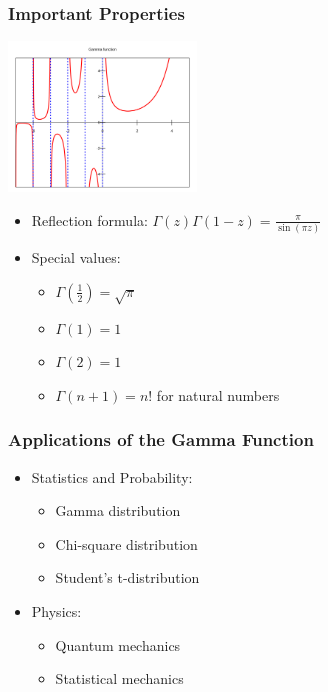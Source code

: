 \documentclass[12pt]{beamer}
\begin{document}
\begin{frame}
	\frametitle{Important Properties}
	\centering
	\includegraphics[width=5cm]{gamma.png}
	\begin{itemize}[label={\color{blue}$\blacktriangleright$}]
		\item Reflection formula: $\Gamma(z)\Gamma(1-z) = \frac{\pi}{\sin(\pi z)}$
		\item Special values:
		\begin{itemize}[label={\color{blue}$\blacktriangleright$}]
			\item $\Gamma(\frac{1}{2}) = \sqrt{\pi}$
			\item $\Gamma(1) = 1$
			\item $\Gamma(2) = 1$
			\item $\Gamma(n+1) = n!$ for natural numbers
		\end{itemize}
	\end{itemize}
\end{frame}

\begin{frame}
	\frametitle{Applications of the Gamma Function}
	\begin{itemize}[label={\color{blue}$\blacktriangleright$}]
		\item Statistics and Probability:
		\begin{itemize}[label={\color{blue}$\blacktriangleright$}]
			\item Gamma distribution
			\item Chi-square distribution
			\item Student's t-distribution
		\end{itemize}
		\item Physics:
		\begin{itemize}[label={\color{blue}$\blacktriangleright$}]
			\item Quantum mechanics
			\item Statistical mechanics
		\end{itemize}
	\end{itemize}
\end{frame}
\end{document}
